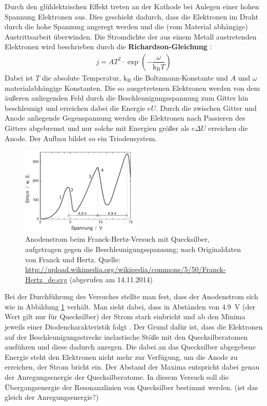 \documentclass[11pt, a4paper]{article}
\begin{document}
Durch den glühlektrischen Effekt treten an der Kathode bei Anlegen einer hohen Spannung Elektronen aus.
Dies geschieht dadurch, dass die Elektronen im Draht durch die hohe Spannung angeregt werden und die (vom Material abhängige) Austrittsarbeit überwinden.
Die Stromdichte der aus einem Metall austretenden Elektronen wird beschrieben durch die \textbf{Richardson-Gleichung} \cite{np_richardson}:
\begin{align*}
j=AT^2\cdot \exp\left({-\dfrac{\omega}{\mathrm{k_B}T}}\right)
\end{align*}
Dabei ist $T$ die absolute Temperatur, $\mathrm{k_B}$ die Boltzmann-Konstante und $A$ und $\omega$ materialabhängige Konstanten.
Die so ausgetretenen Elektronen werden von dem äußeren anliegenden Feld durch die Beschleunigungsspannung zum Gitter hin beschleunigt und erreichen dabei die Energie $eU$.
Durch die zwischen Gitter und Anode anliegende Gegenspannung werden die Elektronen nach Passieren des Gitters abgebremst und nur solche mit Energien größer als $e\Delta U$ erreichen die Anode.
Der Aufbau bildet so ein Triodensystem.

\begin{figure}[h]
\centering
\includegraphics[width=0.5\textwidth]{./figures/franck-hertz_ergebnis.pdf}
\caption{Anodenstrom beim Franck-Hertz-Versuch mit Quecksilber, aufgetragen gegen die Beschleunigungsspannung; nach Originaldaten von Franck und Hertz. Quelle: \url{http://upload.wikimedia.org/wikipedia/commons/5/50/Franck-Hertz_de.svg} (abgerufen am 14.11.2014)}
\label{fig:franck-hertz_ergebnis}
\end{figure}

Bei der Durchführung des Versuches stellte man fest, dass der Anodenstrom sich wie in Abbildung \ref{fig:franck-hertz_ergebnis} verhält.
Man sieht dabei, dass in Abständen von \SI{4.9}{\volt} (der Wert gilt nur für Quecksilber) der Strom stark einbricht und ab den Minima jeweils einer Diodencharakteristik folgt \cite{demtroeder3}.
Der Grund dafür ist, dass die Elektronen auf der Beschleunigungsstrecke inelastische Stöße mit den Quecksilberatomen ausführen und diese dadurch anregen.
Die dabei an das Quecksilber abgegebene Energie steht den Elektronen nicht mehr zur Verfügung, um die Anode zu erreichen, der Strom bricht ein. 
Der Abstand der Maxima entspricht dabei genau der Anregungsenergie der Quecksilberatome.
In diesem Versuch soll die Übergangsenergie der Resonanzlinien von Quecksilber bestimmt werden. (ist das gleich der Anregungsenergie?)
\end{document}
